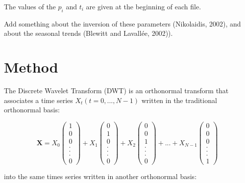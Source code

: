 \documentclass[main.tex]{subfiles}
\begin{document}
The values of the $p_i$ and $t_i$ are given at the beginning of each file.

Add something about the inversion of these parameters (Nikolaidis, 2002), and about the seasonal trends (Blewitt and Lavall\'ee, 2002)). 

\chapter{Method}

The Discrete Wavelet Transform (DWT) is an orthonormal transform that associates a time series $X_t (t = 0 , ... , N - 1)$ written in the traditional orthonormal basis:

\begin{equation}
\bm{X} = X_0 \begin{pmatrix} 1 \\ 0 \\ 0 \\ . \\ . \\ . \\ 0 \end{pmatrix}
+ X_1 \begin{pmatrix} 0 \\ 1 \\ 0 \\ . \\ . \\ . \\ 0 \end{pmatrix}
+ X_2 \begin{pmatrix} 0 \\ 0 \\ 1 \\ . \\ . \\ . \\ 0 \end{pmatrix}
+ ... + X_{N - 1} \begin{pmatrix} 0 \\ 0 \\ 0 \\ . \\ . \\ . \\ 1 \end{pmatrix}
\end{equation}

into the same times series written in another orthonormal basis:
\end{document}
